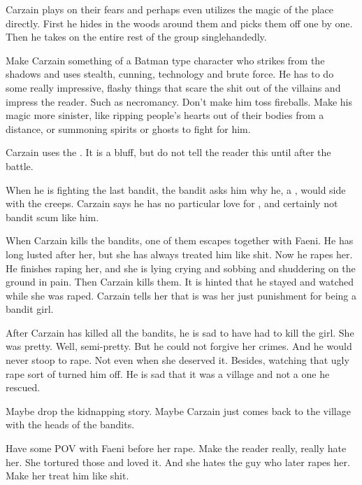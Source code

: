 Carzain plays on their fears and perhaps even utilizes the magic of the place directly. 
First he hides in the woods around them and picks them off one by one.
Then he takes on the entire rest of the group singlehandedly.

Make Carzain something of a Batman type character who strikes from the shadows and uses stealth, cunning, technology and brute force.
He has to do some really impressive, flashy things that scare the shit out of the villains and impress the reader. 
Such as necromancy.
Don't make him toss fireballs.
Make his magic more sinister, like ripping people's hearts out of their bodies from a distance, or summoning spirits or ghosts to fight for him.

Carzain uses the \qliphah \Shurreem. 
It is a bluff, but do not tell the reader this until after the battle. 



\begin{comment}
  \section{Killing the last bandits}
\end{comment}

When he is fighting the last bandit, the bandit asks him why he, a \human, would side with the creeps.
Carzain says he has no particular love for \humans, and certainly not bandit scum like him.

When Carzain kills the bandits, one of them escapes together with Faeni.
He has long lusted after her, but she has always treated him like shit.
Now he rapes her.
He finishes raping her, and she is lying crying and sobbing and shuddering on the ground in pain.
Then Carzain kills them.
It is hinted that he stayed and watched while she was raped.
Carzain tells her that is was her just punishment for being a bandit girl.

After Carzain has killed all the bandits, he is sad to have had to kill the girl.
She was pretty.
Well, semi-pretty.
But he could not forgive her crimes.
And he would never stoop to rape.
Not even when she deserved it.
Besides, watching that ugly rape sort of turned him off.
He is sad that it was a \scatha village and not a \human one he rescued.

Maybe drop the kidnapping story.
Maybe Carzain just comes back to the village with the heads of the bandits.

Have some POV with Faeni before her rape.
Make the reader really, really hate her.
She tortured those \scathae and loved it.
And she hates the guy who later rapes her.
Make her treat him like shit.

